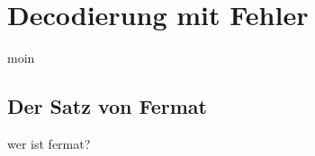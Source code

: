 %
%
%
\section{Decodierung mit Fehler
\label{reedsolomon:section:decmitfehler}}
moin


\subsection{Der Satz von Fermat
\label{reedsolomon:subsection:fermat}}
wer ist fermat?


